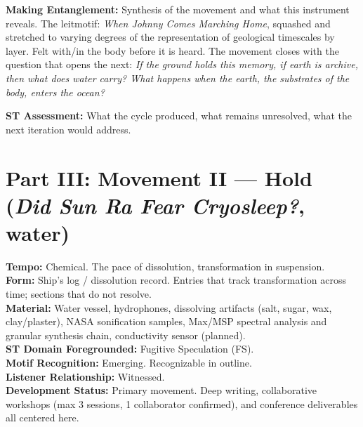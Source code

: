 \noindent\textbf{Making Entanglement:} Synthesis of the movement and what this instrument reveals. The leitmotif: \textit{When Johnny Comes Marching Home}, squashed and stretched to varying degrees of the representation of geological timescales by layer. Felt with/in the body before it is heard. The movement closes with the question that opens the next: \textit{If the ground holds this memory, if earth is archive, then what does water carry? What happens when the earth, the substrates of the body, enters the ocean?}

\noindent\textbf{ST Assessment:} What the cycle produced, what remains unresolved, what the next iteration would address.

\bigskip


\section*{Part III: Movement II --- Hold (\textit{Did Sun Ra Fear Cryosleep?}, water)}


\noindent\textbf{Tempo:} Chemical. The pace of dissolution, transformation in suspension.\\
\noindent\textbf{Form:} Ship's log / dissolution record. Entries that track transformation across time; sections that do not resolve.\\
\noindent\textbf{Material:} Water vessel, hydrophones, dissolving artifacts (salt, sugar, wax, clay/plaster), NASA sonification samples, Max/MSP spectral analysis and granular synthesis chain, conductivity sensor (planned).\\
\noindent\textbf{ST Domain Foregrounded:} Fugitive Speculation (FS).\\
\noindent\textbf{Motif Recognition:} Emerging. Recognizable in outline.\\
\noindent\textbf{Listener Relationship:} Witnessed.\\
\noindent\textbf{Development Status:} Primary movement. Deep writing, collaborative workshops (max 3 sessions, 1 collaborator confirmed), and conference deliverables all centered here.

